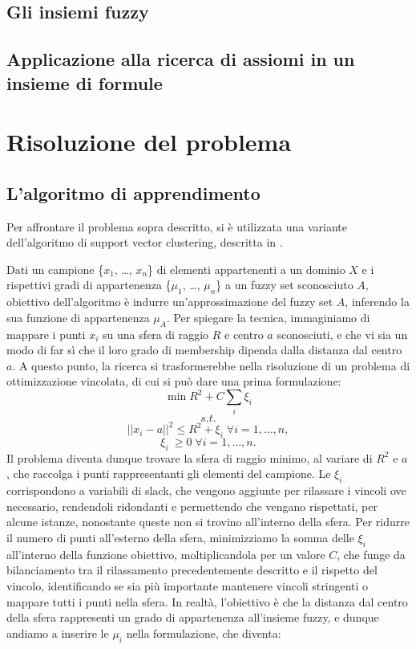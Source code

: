 \documentclass[12pt,a4paper]{report}
\begin{document}
\section{Gli insiemi fuzzy}
\section{Applicazione alla ricerca di assiomi in un insieme di formule}

\chapter{Risoluzione del problema}
\section{L'algoritmo di apprendimento}
Per affrontare il problema sopra descritto, si è utilizzata una variante dell'algoritmo di support vector clustering, descritta in \cite{svpaper}.

Dati un campione  \{$x_1$, \dots , $x_n$\} di elementi appartenenti a un dominio $X$ e i rispettivi gradi di appartenenza  \{$\mu_1$, \dots , $\mu_n$\}  a un fuzzy set sconosciuto $A$, obiettivo dell'algoritmo è indurre un'approssimazione del fuzzy set $A$,  inferendo la sua funzione di appartenenza $\mu_A$. Per spiegare la tecnica, immaginiamo di mappare i punti  $x_i$ su una sfera di raggio $R$  e centro $a$ sconosciuti, e che vi sia un modo di far sì che il  loro  grado di membership dipenda dalla distanza dal centro $a$.
A questo punto, la ricerca si trasformerebbe nella risoluzione di un problema di ottimizzazione vincolata, di cui si può dare una prima formulazione:
\[ \min R^2 + C\sum_{i} \xi_{i}\]
\[s.t.\]
\[||x_i - a||^2  \leq R^2 + \xi_{i} \; \forall i = 1, \dots, n,\]
\[ \xi_{i}\ \geq 0 \; \forall i = 1, \dots, n.\]
Il problema diventa dunque trovare la sfera di raggio minimo, al variare di $R^2$ e $a$, che raccolga i punti rappresentanti gli elementi del campione.  
Le $\xi_i$ corrispondono a variabili di slack, che vengono aggiunte per rilassare i vincoli ove necessario, rendendoli ridondanti e permettendo che vengano rispettati, per alcune istanze, nonostante queste non si trovino all'interno della sfera. Per ridurre il numero di punti all'esterno della sfera, minimizziamo la somma delle $\xi_i$ all'interno della funzione obiettivo, moltiplicandola per un valore $C$, che funge da bilanciamento tra il rilassamento precedentemente descritto e il rispetto del vincolo, identificando se sia più importante mantenere vincoli stringenti o mappare tutti i punti nella sfera.
In realtà, l'obiettivo è che la distanza dal centro della sfera rappresenti un grado di appartenenza all'insieme fuzzy, e dunque andiamo a inserire le $\mu_i$ nella formulazione, che diventa:
\end{document}
